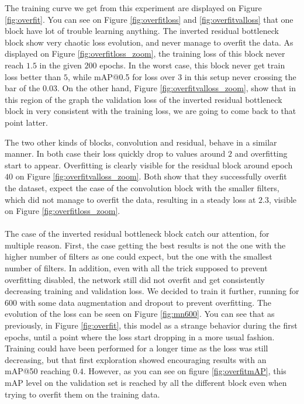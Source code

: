 The training curve we get from this experiment are displayed on Figure \ref{fig:overfit}. You can see on Figure \ref{fig:overfitloss} and \ref{fig:overfitvalloss} that one block have lot of trouble learning anything. The inverted residual bottleneck block show very chaotic loss evolution, and never manage to overfit the data. As displayed on Figure \ref{fig:overfitloss_zoom}, the training loss of this block never reach $1.5$ in the given $200$ epochs. In the worst case, this block never get train loss better than $5$, while mAP@0.5 for loss over $3$ in this setup never crossing the bar of the $0.03$. On the other hand, Figure \ref{fig:overfitvalloss_zoom}, show that in this region of the graph the validation loss of the inverted residual bottleneck block in very consistent with the training loss, we are going to come back to that point latter.

The two other kinds of blocks, convolution and residual, behave in a similar manner. In both case their loss quickly drop to values around $2$ and overfitting start to appear. Overfitting is clearly visible for the residual block around epoch $40$ on Figure \ref{fig:overfitvalloss_zoom}. Both show that they successfully overfit the dataset, expect the case of the convolution block with the smaller filters, which did not manage to overfit the data, resulting in a steady loss at $2.3$, visible on Figure \ref{fig:overfitloss_zoom}.

\paragraph{}
The case of the inverted residual bottleneck block catch our attention, for multiple reason. First, the case getting the best results is not the one with the higher number of filters as one could expect, but the one with the smallest number of filters. In addition, even with all the trick supposed to prevent overfitting disabled, the network still did not overfit and get consistently decreasing training and validation loss. We decided to train it further, running for $600$ with some data augmentation and dropout to prevent overfitting. The evolution of the loss can be seen on Figure \ref{fig:mn600}. You can see that as previously, in Figure \ref{fig:overfit}, this model as a strange behavior during the first epochs, until a point where the loss start dropping in a more usual fashion. Training could have been performed for a longer time as the loss was still decreasing, but that first exploration showed encouraging results with an mAP@50 reaching $0.4$. However, as you can see on figure \ref{fig:overfitmAP}, this mAP level on the validation set is reached by all the different block even when trying to overfit them on the training data.

